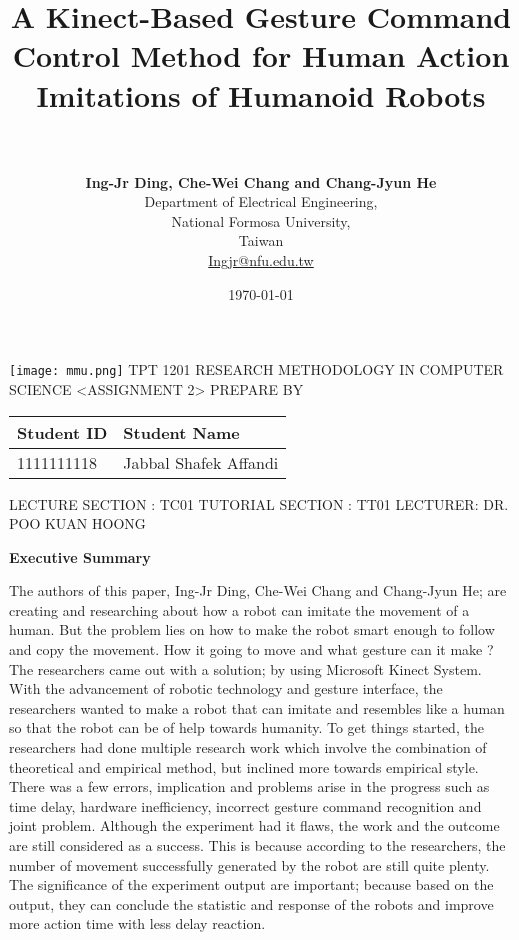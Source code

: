 \documentclass[a4paper,12pt]{article}
\title{A Kinect-Based Gesture Command Control Method
for Human Action Imitations of Humanoid Robots}
\author{\\ \\ \textbf{Ing-Jr Ding, Che-Wei Chang and Chang-Jyun He}\\Department of Electrical Engineering, \\ National Formosa University, \\ Taiwan \\ \url{Ingjr@nfu.edu.tw}}
\date{\today}
\begin{document}
\thispagestyle{empty}
\begin{center}

\texttt{[image: mmu.png]}
\break\break\break\break
\Huge
TPT 1201\break\break
RESEARCH METHODOLOGY \break
IN \break
COMPUTER SCIENCE \break\break\break\break
\textless ASSIGNMENT 2\textgreater \break\break\break\break 
\Large
PREPARE BY \break\break
\begin{tabular}{| m{7.5cm} | m{9cm} |}
\hline
\hspace{2.3cm}Student ID &\hspace{2.5cm}Student Name \\
\hline
\hspace{2.05cm}1111111118 &\hspace{1.5cm} Jabbal Shafek Affandi \\
\hline
\end{tabular}
\break\break
LECTURE SECTION \hspace{5mm}: TC01\break
TUTORIAL SECTION \hspace{2mm}: TT01\break
LECTURER: {DR. POO KUAN HOONG}
\end{center}



\restoregeometry
\maketitle
\begin{center}
\bfseries Executive Summary 
\end {center}
{The authors of this paper, Ing-Jr Ding, Che-Wei Chang and Chang-Jyun He; are creating and researching about how a robot can imitate the movement of a human. But the problem lies on how to make the robot smart enough to follow and copy the movement. How it going to move and what gesture can it make ? The researchers came out with a solution; by using Microsoft Kinect System. With the advancement of robotic technology and gesture interface, the researchers wanted to make a robot that can imitate and resembles like a human so that the robot can be of help towards humanity. To get things started, the researchers had done multiple research work which involve the combination of theoretical and empirical method, but inclined more towards empirical style. There was a few errors, implication and problems arise in the progress such as time delay, hardware inefficiency, incorrect gesture command recognition and joint problem. Although the experiment had it flaws, the work and the outcome are still considered as a success. This is because according to the researchers, the number of movement successfully generated by the robot are still quite plenty. The significance of the experiment output are important; because based on the output, they can conclude the statistic and response of the robots and improve more action time with less delay reaction.}
\thispagestyle{empty}
\tableofcontents
\thispagestyle{empty}
\end{document}
